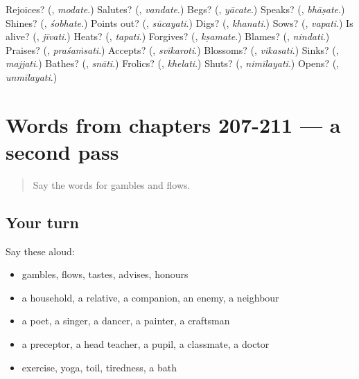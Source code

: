 \begin{tcolorbox}[breakable,colback=teal!4,colframe=teal!35!black,title={Before you move on}]
Rejoices? (\textbf{}, \emph{modate}.) Salutes? (\textbf{}, \emph{vandate}.) Begs? (\textbf{}, \emph{yācate}.) Speaks? (\textbf{}, \emph{bhāṣate}.) Shines? (\textbf{}, \emph{śobhate}.) Points out? (\textbf{}, \emph{sūcayati}.) Digs? (\textbf{}, \emph{khanati}.) Sows? (\textbf{}, \emph{vapati}.) Is alive? (\textbf{}, \emph{jīvati}.) Heats? (\textbf{}, \emph{tapati}.) Forgives? (\textbf{}, \emph{kṣamate}.) Blames? (\textbf{}, \emph{nindati}.) Praises? (\textbf{}, \emph{praśaṁsati}.) Accepts? (\textbf{}, \emph{svīkaroti}.) Blossoms? (\textbf{}, \emph{vikasati}.) Sinks? (\textbf{}, \emph{majjati}.) Bathes? (\textbf{}, \emph{snāti}.) Frolics? (\textbf{}, \emph{khelati}.) Shuts? (\textbf{}, \emph{nimīlayati}.) Opens? (\textbf{}, \emph{unmīlayati}.)
\end{tcolorbox}
\section[(dialogue)]{Words from chapters 207-211 — a second pass}

\label{lesson:SA-R211-second-pass-words-from-chapters-207-211}



\begin{quote}
Say the words for gambles and flows.
\end{quote}

\subsection*{Your turn}
Say these aloud:

\begin{itemize}
\raggedright
  \item gambles, flows, tastes, advises, honours
  \item a household, a relative, a companion, an enemy, a neighbour
  \item a poet, a singer, a dancer, a painter, a craftsman
  \item a preceptor, a head teacher, a pupil, a classmate, a doctor
  \item exercise, yoga, toil, tiredness, a bath
\end{itemize}

